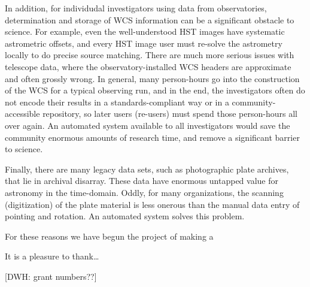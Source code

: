 \documentclass[12pt,preprint]{aastex}
\begin{document}
In addition, for individudal investigators using data from
observatories, determination and storage of WCS information can be a
significant obstacle to science.  For example, even the
well-understood HST images have systematic astrometric offsets, and
every HST image user must re-solve the astrometry locally to do
precise source matching.  There are much more serious issues with
telescope data, where the observatory-installed WCS headers are
approximate and often grossly wrong.  In general, many person-hours go
into the construction of the WCS for a typical observing run, and in
the end, the investigators often do not encode their results in a
standards-compliant way or in a community-accessible repository, so
later users (re-users) must spend those person-hours all over again.
An automated system available to all investigators would save the
community enormous amounts of research time, and remove a significant
barrier to science.

Finally, there are many legacy data sets, such as photographic plate
archives, that lie in archival disarray.  These data have enormous
untapped value for astronomy in the time-domain.  Oddly, for many
organizations, the scanning (digitization) of the plate material is
less onerous than the manual data entry of pointing and rotation.  An
automated system solves this problem.

For these reasons we have begun the project of making a

\acknowledgements
It is a pleasure to thank\ldots

[DWH: grant numbers??]
\end{document}
